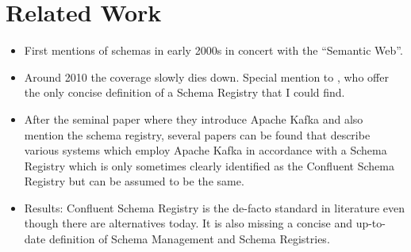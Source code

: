 
\section{Related Work}\label{sec:related-work}

\begin{itemize}
  \item First mentions of schemas in early 2000s in concert with the \enquote{Semantic Web}. \parencites{heery_metadata_2003}{dogac_semantically_2004}{li_semantic_2004}{crapo_semantically_2009}
  \item Around 2010 the coverage slowly dies down. Special mention to \cite{ma_iip_2010}, who offer the only concise definition of a Schema Registry that I could find.
  \item After the seminal paper \cite{kreps_kafka_2011} where they introduce Apache Kafka and also mention the schema registry, several papers can be found that describe various systems which employ Apache Kafka in accordance with a Schema Registry which is only sometimes clearly identified as the Confluent Schema Registry but can be assumed to be the same. \parencites{muller_iot_2017}{radchenko_micro-workflows_2018}{ranjan_radar-base_2019}{holom_metadata_2020}
  \item Results: Confluent Schema Registry is the de-facto standard in literature  even though there are alternatives today. It is also missing a concise and up-to-date definition of Schema Management and Schema Registries.
\end{itemize}
